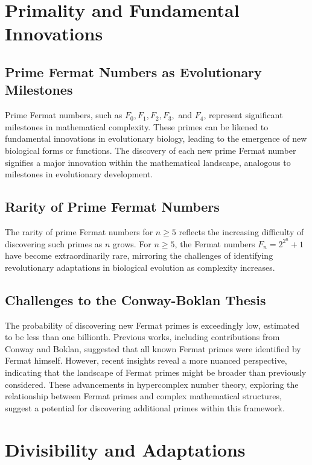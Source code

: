 \documentclass[12pt]{article}
\begin{document}
\section{Primality and Fundamental Innovations}

\subsection{Prime Fermat Numbers as Evolutionary Milestones}

Prime Fermat numbers, such as \( F_0, F_1, F_2, F_3, \) and \( F_4 \), represent significant milestones in mathematical complexity. These primes can be likened to fundamental innovations in evolutionary biology, leading to the emergence of new biological forms or functions. The discovery of each new prime Fermat number signifies a major innovation within the mathematical landscape, analogous to milestones in evolutionary development.

\subsection{Rarity of Prime Fermat Numbers}

The rarity of prime Fermat numbers for \( n \geq 5 \) reflects the increasing difficulty of discovering such primes as \( n \) grows. For \( n \geq 5 \), the Fermat numbers \( F_n = 2^{2^n} + 1 \) have become extraordinarily rare, mirroring the challenges of identifying revolutionary adaptations in biological evolution as complexity increases. 

\subsection{Challenges to the Conway-Boklan Thesis}

The probability of discovering new Fermat primes is exceedingly low, estimated to be less than one billionth. Previous works, including contributions from Conway and Boklan, suggested that all known Fermat primes were identified by Fermat himself. However, recent insights reveal a more nuanced perspective, indicating that the landscape of Fermat primes might be broader than previously considered. These advancements in hypercomplex number theory, exploring the relationship between Fermat primes and complex mathematical structures, suggest a potential for discovering additional primes within this framework.

\section{Divisibility and Adaptations}
\end{document}
